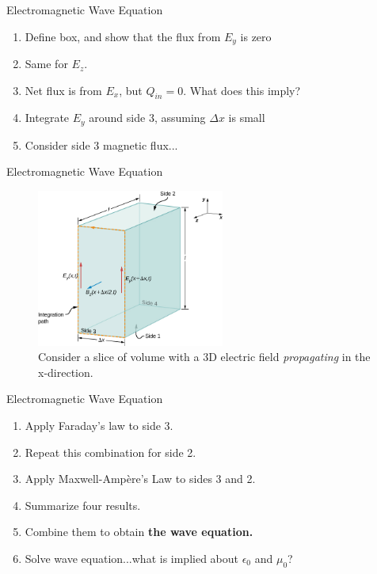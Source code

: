 \documentclass{beamer}
\begin{document}
\begin{frame}{Electromagnetic Wave Equation}
\begin{enumerate}
\item Define box, and show that the flux from $E_y$ is zero
\item Same for $E_z$.
\item Net flux is from $E_x$, but $Q_{in} = 0$.  What does this imply?
\item Integrate $E_y$ around side 3, assuming $\Delta x$ is small
\item Consider side 3 magnetic flux... 
\end{enumerate}
\end{frame}

\begin{frame}{Electromagnetic Wave Equation}
\begin{figure}
\centering
\includegraphics[width=0.55\textwidth]{figures/wave2.jpeg}
\caption{\label{fig:wave2} Consider a slice of volume with a 3D electric field \textit{propagating} in the x-direction.}
\end{figure}
\end{frame}

\begin{frame}{Electromagnetic Wave Equation}
\begin{enumerate}
\item Apply Faraday's law to side 3.
\item Repeat this combination for side 2.
\item Apply Maxwell-Amp\`{e}re's Law to sides 3 and 2.
\item Summarize four results.
\item Combine them to obtain \textbf{the wave equation.}
\item Solve wave equation...what is implied about $\epsilon_0$ and $\mu_0$?
\end{enumerate}
\end{frame}
\end{document}
